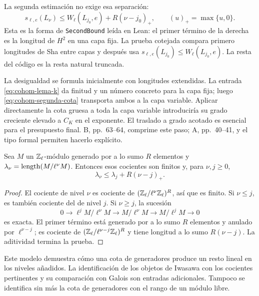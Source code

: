 La segunda estimación no exige esa separación:
\begin{equation}
 s_{\ell,e}(L_\nu)
 \le W_\ell(L_{j_0},e)+R(\nu-j_0)_+,
 \qquad (u)_+=\max\{u,0\}.
 \label{eq:cohom-segunda-cota}
\end{equation}
Esta es la forma de \texttt{SecondBound} leída en Lean:
el primer término de la derecha es la longitud de
$H^2$ en una capa fija.
La prueba cotejada compara primero longitudes de Sha
entre capas y después usa
$s_{\ell,e}(L_{j_0})\le W_\ell(L_{j_0},e)$.
La resta del código es la resta natural truncada.

La desigualdad se formula inicialmente con longitudes
extendidas. La entrada \eqref{eq:cohom-lema-k} da
finitud y un número concreto para la capa fija; luego
\eqref{eq:cohom-segunda-cota} transporta ambos a la
capa variable.
Aplicar directamente la cota gruesa a toda la capa
variable introduciría su grado creciente elevado a
$C_K$ en el exponente.
El traslado a grado acotado es esencial para el
presupuesto final.
B, pp.~63--64, comprime este paso; A, pp.~40--41, y
el tipo formal permiten hacerlo explícito.

\begin{lema}
\label{lem:cohom-crecimiento}
Sea $M$ un $\mathbb{Z}_\ell$-módulo generado por a lo sumo
$R$ elementos y $\lambda_\nu=\operatorname{length}(M/\ell^\nu M)$.
Entonces esos cocientes son finitos y, para $\nu,j\ge0$,
\[
 \lambda_\nu\le\lambda_j+R(\nu-j)_+.
\]
\end{lema}

\begin{proof}
El cociente de nivel $\nu$ es cociente de
$(\mathbb{Z}_\ell/\ell^\nu\mathbb{Z}_\ell)^R$, así que es finito.
Si $\nu\le j$, es también cociente del de nivel $j$.
Si $\nu\ge j$, la sucesión
\[
 0\longrightarrow\ell^jM/\ell^\nu M
 \longrightarrow M/\ell^\nu M
 \longrightarrow M/\ell^jM\longrightarrow0
\]
es exacta. El primer término está generado por a lo
sumo $R$ elementos y anulado por $\ell^{\nu-j}$;
es cociente de
$(\mathbb{Z}_\ell/\ell^{\nu-j}\mathbb{Z}_\ell)^R$ y tiene longitud
a lo sumo $R(\nu-j)$.
La aditividad termina la prueba.
\end{proof}

Este modelo demuestra cómo una cota de generadores
produce un resto lineal en los niveles añadidos.
La identificación de los objetos de Iwasawa con los
cocientes pertinentes y su comparación con Galois
son entradas adicionales.
Tampoco se identifica sin más la cota de generadores
con el rango de un módulo libre.

